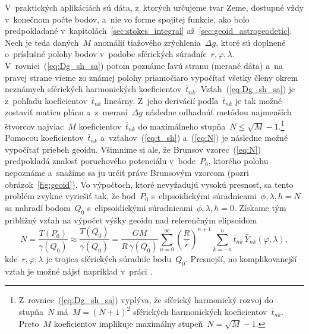 \documentclass[a4paper, 12pt]{book}
\begin{document}
V~praktických aplikáciách sú dáta, z~ktorých určujeme tvar Zeme, dostupné vždy 
v~konečnom počte bodov, a~nie vo forme spojitej funkcie, ako bolo predpokladané 
v~kapitolách~\ref{sec:stokes_integral} až~\ref{sec:geoid_astrogeodetic}.  Nech 
je teda daných~$M$ anomálií tiažového zrýchlenia~$\Delta g$, ktoré sú doplnené 
o~príslušné polohy bodov v~podobe sférických súradníc~$r, \varphi, \lambda$.  
V~rovnici~(\ref{eq:Dg_sh_sa}) potom poznáme ľavú stranu (merané dáta) a~na 
pravej strane vieme zo známej polohy priamočiaro vypočítať všetky členy okrem 
neznámych sférických harmonických koeficientov~$\bar{t}_{nk}$.  
Vzťah~(\ref{eq:Dg_sh_sa}) je z~pohľadu koeficientov~$\bar{t}_{nk}$ lineárny.  
Z~jeho derivácií podľa~$\bar{t}_{nk}$ je tak možné zostaviť maticu plánu 
a~z~meraní~$\Delta g$ následne odhadnúť metódou najmenších štvorcov najviac~$M$ 
koeficientov~$\bar{t}_{nk}$ do maximálneho stupňa~$N \leq \sqrt{M} 
- 1$.\footnote{Z~rovnice~(\ref{eq:Dg_sh_sa}) vyplýva, že sférický harmonický 
rozvoj do stupňa~$N$ má~$M = (N + 1)^2$ sférických harmonických 
koeficientov~$\bar{t}_{nk}$.  Preto~$M$ koeficientov implikuje maximálny 
stupeň~$N = \sqrt{M} - 1$.}  Pomocou koeficientov~$\bar{t}_{nk}$ 
a~vzťahov~(\ref{eq:t_sh}) a~(\ref{eq:N}) je následne možné vypočítať priebeh 
geoidu.  Všimnime si ale, že Brunsov vzorec~(\ref{eq:N}) predpokladá znalosť 
poruchového potenciálu v~bode~$P_0$, ktorého polohu nepoznáme a~snažíme sa ju 
určiť práve Brunsovým vzorcom (pozri obrázok~\ref{fig:geoid}). Vo výpočtoch, 
ktoré nevyžadujú vysokú presnosť, sa tento problém zvykne vyriešiť tak, že 
bod~$P_0$ s~elipsoidickými súradnicami~$\phi, \lambda, h = N$ sa nahradí 
bodom~$Q_0$ s~elipsoidickými súradnicami~$\phi, \lambda, h = 0$.  Získame tým 
približný vzťah na výpočet výšky geoidu nad referenčným elipsoidom
%
\begin{equation}
\label{eq:geoid_sh}
N = \frac{T(P_0)}{\gamma(Q_0)} \approx \frac{T(Q_0)}{\gamma(Q_0)} = \frac{GM}{R 
\, \gamma(Q_0)} \sum_{n = 0}^\infty \left( \frac{R}{r} \right)^{n
+ 1} \sum_{k = -n}^{n} \bar{t}_{nk} \, \bar{Y}_{nk}(\varphi, \lambda){,}
\end{equation}
%
kde~$r, \varphi, \lambda$ je trojica sférických súradníc bodu~$Q_0$.  
Presnejší, no komplikovanejší vzťah je možné nájsť napríklad v~práci 
\textcite{Barthelmes2013}.
\end{document}
